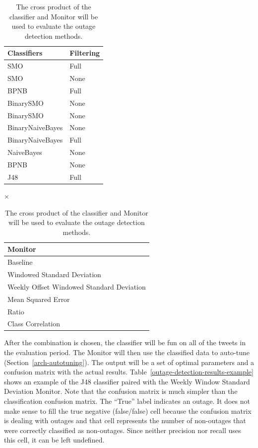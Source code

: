 \documentclass[12pt]{ucthesis}
\begin{document}
\begin{table}[H]
   \footnotesize
   \begin{center}
      \begin{tabular}{|l|l|}
         \hline
            \textbf{Classifiers} & \textbf{Filtering}
         \tabularnewline\hline
            SMO & Full
         \tabularnewline\hline
            SMO & None
         \tabularnewline\hline
            BPNB & Full
         \tabularnewline\hline
            BinarySMO & None
         \tabularnewline\hline
            BinarySMO & None
         \tabularnewline\hline
            BinaryNaiveBayes & None
         \tabularnewline\hline
            BinaryNaiveBayes & Full
         \tabularnewline\hline
            NaiveBayes & None
         \tabularnewline\hline
            BPNB & None
         \tabularnewline\hline
            J48 & Full
         \tabularnewline\hline
      \end{tabular}
      {
         \Huge
         $\times$
      }
      \begin{tabular}{|l|}
         \hline
            \textbf{Monitor}
         \tabularnewline\hline
            Baseline
         \tabularnewline\hline
            Windowed Standard Deviation
         \tabularnewline\hline
            Weekly Offset Windowed Standard Deviation
         \tabularnewline\hline
            Mean Squared Error
         \tabularnewline\hline
            Ratio
         \tabularnewline\hline
            Class Correlation
         \tabularnewline\hline
      \end{tabular}
      \caption[Outage Detection Evaluation Combinations]{The cross product of the classifier and Monitor will be used to evaluate the outage detection methods.}
      \label{table:outageDetectionEvaluationSpace}
   \end{center}
\end{table}

After the combination is chosen, the classifier will be fun on all of the tweets in the evaluation period.
The Monitor will then use the classified data to auto-tune (Section~\ref{arch-autotuning}).
The output will be a set of optimal parameters and a confusion matrix with the actual results.
Table~\ref{outage-detection-results-example} shows an example of the J48 classifier paired with the Weekly Window Standard Deviation Monitor.
Note that the confusion matrix is much simpler than the classification confusion matrix.
The ``True'' label indicates an outage.
It does not make sense to fill the true negative (false/false) cell because the confusion matrix is dealing with outages and that cell represents the number of non-outages that were correctly classified as non-outages.
Since neither precision nor recall uses this cell, it can be left undefined.
\end{document}
